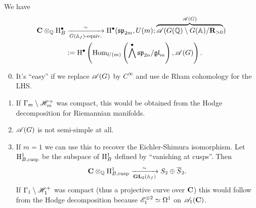 \begin{theorem}
	We have
	\begin{align*}
		\mathbf{C}\otimes_\mathbb Q \mathrm{H}^{\bullet}_B &\xrightarrow[G(\mathbb{A}_f)\text{-equiv.}]{\sim} \mathrm{H}^{\bullet}( \mathfrak{sp}_{2m}, U(m); \overbrace{\mathscr{A}(G(\mathbb Q) \setminus G(\mathbb{A}) / \mathbf{R}_{>0}}^{\mathscr{A}(G)} )  \\
						 &:= \mathrm{H}^{\bullet} \left( \operatorname{Hom}_{U(m)}\left( \bigwedge^{\bullet}\mathfrak{sp}_{2n} / \mathfrak{gl}_m \right) , \mathscr{A}(G) \right) .
	\end{align*}
\end{theorem}
\begin{remark}\leavevmode
	\begin{enumerate}[1)]
		\setcounter{enumi}{-1}
		\item It's ``easy'' if we replace $\mathscr{A}(G)$ by $C^{\infty}$ and use de Rham cohomology for the LHS.
		\item If $\Gamma_m\setminus \mathscr H_m^{+}$ was compact, this would be obtained from the Hodge decomposition for Riemannian manifolds.
		\item $\mathscr{A}(G)$ is not semi-simple at all.
		\item If $m=1$ we can use this to recover the Eichler-Shimura isomorphism. Let $\mathrm{H}^{1}_{B,\text{cusp}}$ be the subspace of $\mathrm{H}^{1}_B$ defined by ``vanishing at cusps''. Then
			\[
				\mathbf{C}\otimes_\mathbb Q \mathrm{H}^{1}_{B,\text{cusp}} \xrightarrow[\mathbf{GL}_2(\mathbb{A}_f)]{\sim} S_2 \oplus \overline{S}_2.
			\] 
			If $\Gamma_1\setminus\mathscr H_1^{+}$ was compact (thus a projective curve over $\mathbf{C}$) this would follow from the Hodge decomposition because $\mathscr{E}_1^{\otimes 2}\simeq \Omega^{1}$ on $\mathscr{A}_1(\mathbf{C})$.
	\end{enumerate}
\end{remark}

